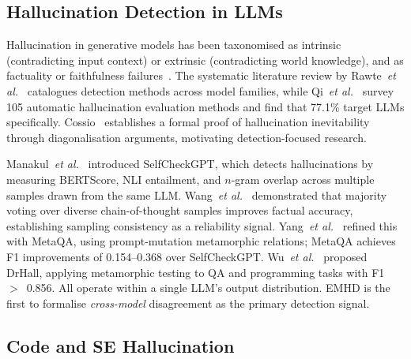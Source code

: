 \documentclass[11pt,a4paper]{article}
\newcommand{\method}{\textsc{EMHD}}
\newcommand{\etal}{\textit{et al.}}
\begin{document}
\subsection{Hallucination Detection in LLMs}

Hallucination in generative models has been taxonomised as intrinsic (contradicting input context) or extrinsic (contradicting world knowledge), and as factuality or faithfulness failures~\cite{huang2025survey}. The systematic literature review by Rawte~\etal~\cite{rawte2025slr} catalogues detection methods across model families, while Qi~\etal~\cite{qi2025survey} survey 105 automatic hallucination evaluation methods and find that 77.1\% target LLMs specifically. Cossio~\cite{cossio2025taxonomy} establishes a formal proof of hallucination inevitability through diagonalisation arguments, motivating detection-focused research.

Manakul~\etal~\cite{manakul2023selfcheckgpt} introduced SelfCheckGPT, which detects hallucinations by measuring BERTScore, NLI entailment, and $n$-gram overlap across multiple samples drawn from the same LLM. Wang~\etal~\cite{wang2023selfconsistency} demonstrated that majority voting over diverse chain-of-thought samples improves factual accuracy, establishing sampling consistency as a reliability signal. Yang~\etal~\cite{yang2025metaqa} refined this with MetaQA, using prompt-mutation metamorphic relations; MetaQA achieves F1 improvements of 0.154--0.368 over SelfCheckGPT. Wu~\etal~\cite{wu2025drhall} proposed DrHall, applying metamorphic testing to QA and programming tasks with F1~$>$~0.856. All operate within a single LLM's output distribution. \method{} is the first to formalise \emph{cross-model} disagreement as the primary detection signal.

\subsection{Code and SE Hallucination}
\end{document}
